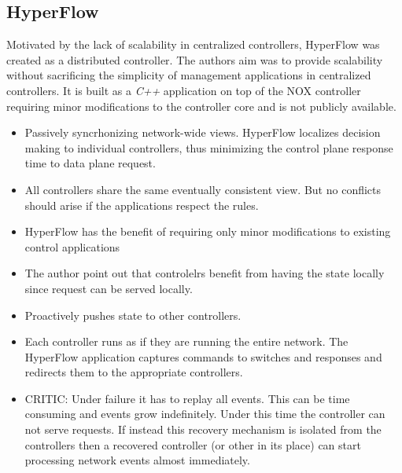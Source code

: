 \begin{itemize}
\subsection{HyperFlow}
Motivated by the lack of scalability in centralized controllers, HyperFlow \cite{Tootoonchian:2010vy} 
was created as a distributed controller. The 
authors aim was to provide scalability without sacrificing
the simplicity of management applications  in  centralized controllers. It
is built as a \emph{C++} application on top of the NOX 
controller \cite{Gude:2008jd} requiring minor modifications to the
controller core and is not publicly available. 
\begin{itemize}
\item Passively syncrhonizing network-wide views. HyperFlow localizes decision making to individual controllers, thus minimizing the control plane response time to data plane request. 
\item All controllers share the same eventually consistent view. But no conflicts should arise if the applications respect the rules. 
\item HyperFlow has the benefit of requiring only minor modifications to existing control applications 
\item The author point out that controlelrs benefit from having the state locally since request can be served locally. 
\item Proactively pushes state to other controllers. 
\item Each controller runs as if they are running the entire network. The HyperFlow application captures commands to switches and responses  and redirects them to the appropriate controllers. 
\item CRITIC: Under failure it has to replay all events. This can be time consuming and events grow indefinitely. Under this time the controller can not serve requests. If instead this recovery mechanism is isolated from the controllers then a recovered controller (or other in its place) can start processing network events almost immediately. 
\end{itemize}



\end{itemize}
